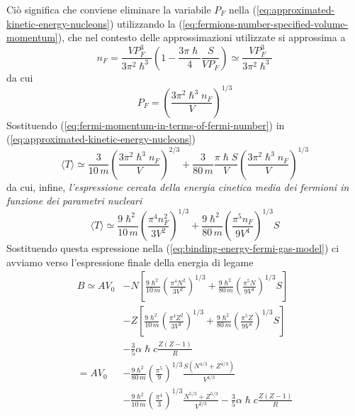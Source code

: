 Ciò significa che conviene eliminare la variabile $P_{F}$ nella (\ref{eq:approximated-kinetic-energy-nucleons}) utilizzando la (\ref{eq:fermions-number-specified-volume-momentum}), che nel contesto delle approssimazioni utilizzate si approssima a
\[
n_{F} =  \frac{VP_{F}^{3}}{3 \pi^{2}\hslash^{3}} \left( 1 -  \frac{3\pi \hslash}{4} \frac{S}{V P_{F}} \right) \simeq \frac{VP_{F}^{3}}{3 \pi^{2} \hslash^{3}}
\]
da cui
\begin{equation}
	P_{F} = \left( \frac{3\pi^{2}\hslash^{3}n_{F}}{V} \right)^{1/3}
	\label{eq:fermi-momentum-in-terms-of-fermi-number}
\end{equation}
Sostituendo (\ref{eq:fermi-momentum-in-terms-of-fermi-number}) in (\ref{eq:approximated-kinetic-energy-nucleons})
\[
\langle T \rangle \simeq \frac{3}{10 \, m} \left( \frac{3\pi^{2}\hslash^{3}n_{F}}{V} \right)^{2/3} + \frac{3}{80 \, m} \frac{\pi \hslash S}{V}\left( \frac{3\pi^{2}\hslash^{3}n_{F}}{V} \right)^{1/3}
\]
da cui, infine, \emph{l’espressione cercata della energia cinetica media dei fermioni in funzione dei parametri nucleari}
\[
\langle T \rangle \simeq \frac{9\hslash^{2}}{10 \, m} \left( \frac{\pi^{4}n_{F}^{2}}{3 V^{2}}\right)^{1/3}  + \frac{9\hslash^{2}}{80 \, m}\left( \frac{\pi^{5}n_{F}}{9V^{4}} \right)^{1/3}S
\]
Sostituendo questa espressione nella (\ref{eq:binding-energy-fermi-gas-model}) ci avviamo verso l’espressione finale della energia di legame
\begin{align*}
	B \simeq A V_{0} &- N \left[ \frac{9\hslash^{2}}{10\, m} \left( \frac{\pi^{4}N^{2}}{3 V^{2}} \right)^{1/3} + \frac{9\hslash^{2}}{80 \, m}\left(  \frac{\pi^{5}N}{9V^{4}} \right)^{1/3}S \right] \\
	& -Z \left[ \frac{9\hslash^{2}}{10\, m} \left( \frac{\pi^{4}Z^{2}}{3 V^{2}} \right)^{1/3} + \frac{9\hslash^{2}}{80 \, m}\left(  \frac{\pi^{5}Z}{9V^{4}} \right)^{1/3}S \right] \\
	& - \frac{3}{5} \alpha \hslash c \frac{Z(Z-1)}{R} \\
	= AV_{0} & - \frac{9\hslash^{2}}{80 \, m}\left( \frac{\pi^{5}}{9} \right)^{1/3} \frac{S(N^{4/3}+Z^{4/3})}{V^{4/3}} \\
	&- \frac{9\hslash^{2}}{10 \, m} \left( \frac{\pi^{4}}{3} \right)^{1/3} \frac{N^{5/3}+Z^{5/3}}{V^{2/3}} - \frac{3}{5} \alpha \hslash c \frac{Z(Z-1)}{R}
\end{align*}
